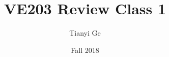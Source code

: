 \documentclass{beamer}
\newif\ifpre
\begin{document}
\title{VE203 Review Class 1}
\institute[FA2018 VE203]{}
\author{Tianyi Ge}
\date{Fall 2018}
\maketitle



\ifpre
\begin{frame}{The End}
  \centering \huge
  Thank You!
\end{frame}
\fi
\end{document}
